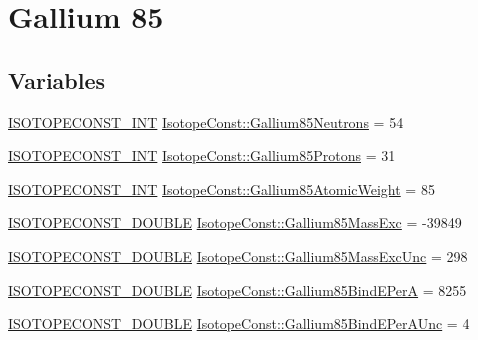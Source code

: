 \hypertarget{group___isotope_const-_gallium-_ga85}{}\section{Gallium 85}
\label{group___isotope_const-_gallium-_ga85}
\subsection*{Variables}
\begin{DoxyCompactItemize}
\item 
\mbox{\hyperlink{group___isotope_const-_macros_ga5f18360b3e99483a35c32d789e62621c}{I\+S\+O\+T\+O\+P\+E\+C\+O\+N\+S\+T\+\_\+\+I\+NT}} \mbox{\hyperlink{group___isotope_const-_gallium-_ga85_ga7f22026bec78dc5ca5fdcc0950bacb85}{Isotope\+Const\+::\+Gallium85\+Neutrons}} = 54
\item 
\mbox{\hyperlink{group___isotope_const-_macros_ga5f18360b3e99483a35c32d789e62621c}{I\+S\+O\+T\+O\+P\+E\+C\+O\+N\+S\+T\+\_\+\+I\+NT}} \mbox{\hyperlink{group___isotope_const-_gallium-_ga85_ga7b1c8be49f7f2b7b3d3a549d4afe1f25}{Isotope\+Const\+::\+Gallium85\+Protons}} = 31
\item 
\mbox{\hyperlink{group___isotope_const-_macros_ga5f18360b3e99483a35c32d789e62621c}{I\+S\+O\+T\+O\+P\+E\+C\+O\+N\+S\+T\+\_\+\+I\+NT}} \mbox{\hyperlink{group___isotope_const-_gallium-_ga85_ga41759fe4517e8c01dc824dfd9140ac37}{Isotope\+Const\+::\+Gallium85\+Atomic\+Weight}} = 85
\item 
\mbox{\hyperlink{group___isotope_const-_macros_ga8f45a7272ce02c0b4c65c44636ed719a}{I\+S\+O\+T\+O\+P\+E\+C\+O\+N\+S\+T\+\_\+\+D\+O\+U\+B\+LE}} \mbox{\hyperlink{group___isotope_const-_gallium-_ga85_gaba92876772cfb97bce3132dc152c9e9a}{Isotope\+Const\+::\+Gallium85\+Mass\+Exc}} = -\/39849
\item 
\mbox{\hyperlink{group___isotope_const-_macros_ga8f45a7272ce02c0b4c65c44636ed719a}{I\+S\+O\+T\+O\+P\+E\+C\+O\+N\+S\+T\+\_\+\+D\+O\+U\+B\+LE}} \mbox{\hyperlink{group___isotope_const-_gallium-_ga85_gad8a882e8770ba6d8dc062cd3fcf8a71b}{Isotope\+Const\+::\+Gallium85\+Mass\+Exc\+Unc}} = 298
\item 
\mbox{\hyperlink{group___isotope_const-_macros_ga8f45a7272ce02c0b4c65c44636ed719a}{I\+S\+O\+T\+O\+P\+E\+C\+O\+N\+S\+T\+\_\+\+D\+O\+U\+B\+LE}} \mbox{\hyperlink{group___isotope_const-_gallium-_ga85_ga7e5bc646ce6095838f26c19aea238024}{Isotope\+Const\+::\+Gallium85\+Bind\+E\+PerA}} = 8255
\item 
\mbox{\hyperlink{group___isotope_const-_macros_ga8f45a7272ce02c0b4c65c44636ed719a}{I\+S\+O\+T\+O\+P\+E\+C\+O\+N\+S\+T\+\_\+\+D\+O\+U\+B\+LE}} \mbox{\hyperlink{group___isotope_const-_gallium-_ga85_gab64ed017bd82806587b2ba9c89787069}{Isotope\+Const\+::\+Gallium85\+Bind\+E\+Per\+A\+Unc}} = 4

\end{DoxyCompactItemize}
